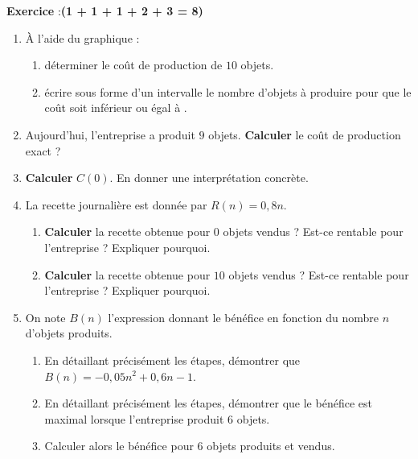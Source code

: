 \documentclass[12pt,french]{article}
\newcounter{exoc}
\newenvironment{exoc}[1]{%
  \refstepcounter{exoc}\textbf{Exercice \theexoc} :\hfill {\textbf{(#1)}}\par
  \medskip}%
{\medskip}
\begin{document}
\begin{exoc}{1 + 1 + 1 + 2 + 3 = 8}
\begin{enumerate}
    \item À l'aide du graphique :
        \begin{enumerate}
            \item déterminer le coût de production de $10$ objets.
            \item écrire sous forme d'un intervalle le nombre d'objets à produire pour que le coût soit inférieur ou égal à .
        \end{enumerate}
    \item Aujourd'hui, l'entreprise a produit $9$ objets. \textbf{Calculer} le coût de production exact ?
    \item \textbf{Calculer} $C(0)$. En donner une interprétation concrète.
    \item La recette journalière est donnée par $R(n) = 0,8n$.
        \begin{enumerate}
            \item \textbf{Calculer} la recette obtenue pour $0$ objets vendus ? Est-ce rentable pour l'entreprise ? Expliquer pourquoi.
            \item \textbf{Calculer} la recette obtenue pour $10$ objets vendus ? Est-ce rentable pour l'entreprise ? Expliquer pourquoi.
        \end{enumerate}
    \item On note $B(n)$ l'expression donnant le bénéfice en fonction du nombre $n$ d'objets produits.
        \begin{enumerate}
            \item En détaillant précisément les étapes, démontrer que $B(n) = -0,05 n^2 + 0,6n - 1$.
            \item En détaillant précisément les étapes, démontrer que le bénéfice est maximal lorsque l'entreprise produit $6$ objets.
            \item Calculer alors le bénéfice pour $6$ objets produits et vendus.
        \end{enumerate}
\end{enumerate}


\end{exoc}
\end{document}

